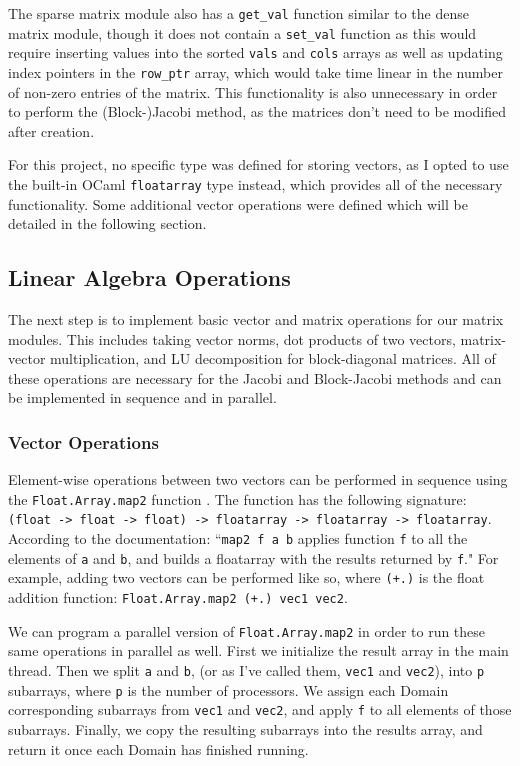 \documentclass[pageno]{jpaper}
\begin{document}
\begin{doublespacing}
The sparse matrix module also has a \verb|get_val| function similar to the dense matrix module, though it does not contain a \verb|set_val| function as this would require inserting values into the sorted \verb|vals| and \verb|cols| arrays as well as updating index pointers in the \verb|row_ptr| array, which would take time linear in the number of non-zero entries of the matrix. This functionality is also unnecessary in order to perform the (Block-)Jacobi method, as the matrices don't need to be modified after creation.

For this project, no specific type was defined for storing vectors, as I opted to use the built-in OCaml \verb|floatarray| type instead, which provides all of the necessary functionality. Some additional vector operations were defined which will be detailed in the following section.

\subsection{Linear Algebra Operations}
The next step is to implement basic vector and matrix operations for our matrix modules. This includes taking vector norms, dot products of two vectors, matrix-vector multiplication, and LU decomposition for block-diagonal matrices. All of these operations are necessary for the Jacobi and Block-Jacobi methods and can be implemented in sequence and in parallel.

\subsubsection{Vector Operations}
Element-wise operations between two vectors can be performed in sequence using the \verb|Float.Array.map2| function \cite{ocaml-docs-floatarray}. The function has the following signature: \verb|(float -> float -> float) -> floatarray -> floatarray -> floatarray|. According to the documentation: ``\verb|map2 f a b| applies function \verb|f| to all the elements of \verb|a| and \verb|b|, and builds a floatarray with the results returned by \verb|f|." For example, adding two vectors can be performed like so, where \verb|(+.)| is the float addition function: \verb|Float.Array.map2 (+.) vec1 vec2|.

We can program a parallel version of \verb|Float.Array.map2| in order to run these same operations in parallel as well. First we initialize the result array in the main thread. Then we split \verb|a| and \verb|b|, (or as I've called them, \verb|vec1| and \verb|vec2|), into \verb|p| subarrays, where \verb|p| is the number of processors. We assign each Domain corresponding subarrays from \verb|vec1| and \verb|vec2|, and apply \verb|f| to all elements of those subarrays. Finally, we copy the resulting subarrays into the results array, and return it once each Domain has finished running.


\end{doublespacing}
\end{document}
